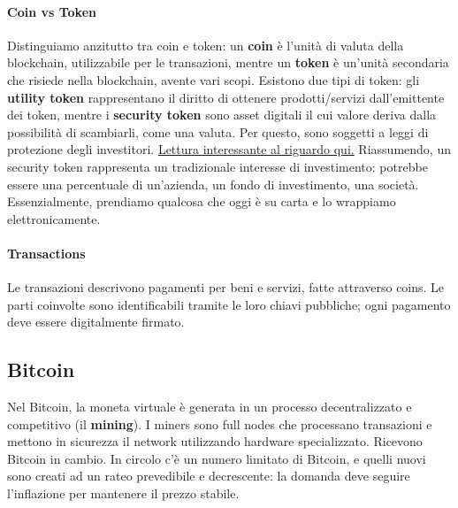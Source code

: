\documentclass[11pt]{article}
\begin{document}
\paragraph{Coin vs Token} Distinguiamo anzitutto tra coin e token: un \textbf{coin} è l'unità di valuta della blockchain, utilizzabile per le transazioni, mentre un \textbf{token} è un'unità secondaria che risiede nella blockchain, avente vari scopi. Esistono due tipi di token: gli \textbf{utility token} rappresentano il diritto di ottenere prodotti/servizi dall'emittente dei token, mentre i \textbf{security token} sono asset digitali il cui valore deriva dalla possibilità di scambiarli, come una valuta. Per questo, sono soggetti a leggi di protezione degli investitori. \href{https://blockgeeks.com/guides/security-tokens/}{Lettura interessante al riguardo qui.} Riassumendo, un security token rappresenta un tradizionale interesse di investimento: potrebbe essere una percentuale di un'azienda, un fondo di investimento, una società. Essenzialmente, prendiamo qualcosa che oggi è su carta e lo wrappiamo elettronicamente. 
\paragraph{Transactions} Le transazioni descrivono pagamenti per beni e servizi, fatte attraverso coins. Le parti coinvolte sono identificabili tramite le loro chiavi pubbliche; ogni pagamento deve essere digitalmente firmato. 
\subsection{Bitcoin}
Nel Bitcoin, la moneta virtuale è generata in un processo decentralizzato e competitivo (il \textbf{mining}). I miners sono full nodes che processano transazioni e mettono in sicurezza il network utilizzando hardware specializzato. Ricevono Bitcoin in cambio. In circolo c'è un numero limitato di Bitcoin, e quelli nuovi sono creati ad un rateo prevedibile e decrescente: la domanda deve seguire l'inflazione per mantenere il prezzo stabile. 
\end{document}
